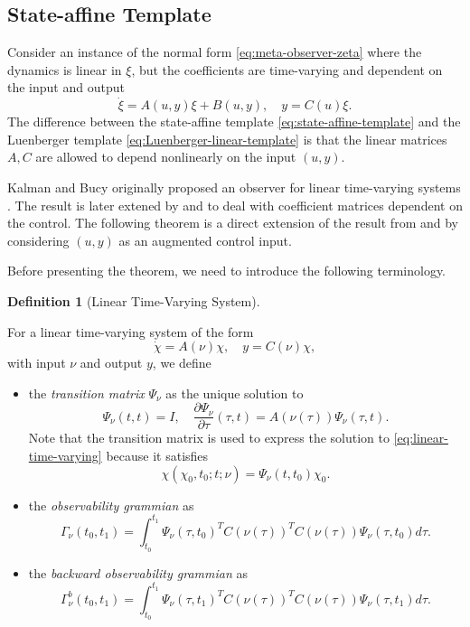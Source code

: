 \documentclass[
]{book}
\theoremstyle{definition}
\newtheorem{definition}{Definition}[chapter]
\theoremstyle{definition}
\theoremstyle{definition}
\theoremstyle{definition}
\theoremstyle{remark}
\begin{document}
\hypertarget{state-affine-template}{%
\subsection{State-affine Template}\label{state-affine-template}}

Consider an instance of the normal form \eqref{eq:meta-observer-zeta} where the dynamics is linear in \(\xi\), but the coefficients are time-varying and dependent on the input and output
\begin{equation}
\dot{\xi} = A(u,y) \xi + B(u,y), \quad y = C(u) \xi.
\label{eq:state-affine-template}
\end{equation}
The difference between the state-affine template \eqref{eq:state-affine-template} and the Luenberger template \eqref{eq:Luenberger-linear-template} is that the linear matrices \(A,C\) are allowed to depend nonlinearly on the input \((u,y)\).

Kalman and Bucy originally proposed an observer for linear time-varying systems \citep{kalman61-new}. The result is later extened by \citep{besanccon96ejc-observer} and \citep{hammouri90cdc-observer} to deal with coefficient matrices dependent on the control. The following theorem is a direct extension of the result from \citep{besanccon96ejc-observer} and \citep{hammouri90cdc-observer} by considering \((u,y)\) as an augmented control input.

Before presenting the theorem, we need to introduce the following terminology.

\begin{definition}[Linear Time-Varying System]
\protect\hypertarget{def:lineartimevarying}{}\label{def:lineartimevarying}

For a linear time-varying system of the form
\begin{equation}
\dot{\chi} = A(\nu) \chi, \quad y = C(\nu) \chi,
\label{eq:linear-time-varying}
\end{equation}
with input \(\nu\) and output \(y\), we define

\begin{itemize}
\item
  the \emph{transition matrix} \(\Psi_\nu\) as the unique solution to
  \[
  \Psi_\nu (t,t) = I, \quad \frac{\partial \Psi_\nu}{\partial \tau}(\tau,t) = A(\nu(\tau)) \Psi_\nu (\tau, t).
  \]
  Note that the transition matrix is used to express the solution to \eqref{eq:linear-time-varying} because it satisfies
  \[
  \chi(\chi_0,t_0;t;\nu) = \Psi_\nu (t,t_0) \chi_0.
  \]
\item
  the \emph{observability grammian} as
  \[
  \Gamma_\nu (t_0,t_1) = \int_{t_0}^{t_1} \Psi_\nu (\tau,t_0)^T C(\nu(\tau))^T C(\nu(\tau)) \Psi_\nu (\tau,t_0) d\tau.
  \]
\item
  the \emph{backward observability grammian} as
  \[
  \Gamma_\nu^b (t_0,t_1) = \int_{t_0}^{t_1} \Psi_\nu (\tau,t_1)^T C(\nu(\tau))^T C(\nu(\tau)) \Psi_\nu (\tau,t_1) d\tau.
  \]
\end{itemize}

\end{definition}
\end{document}
